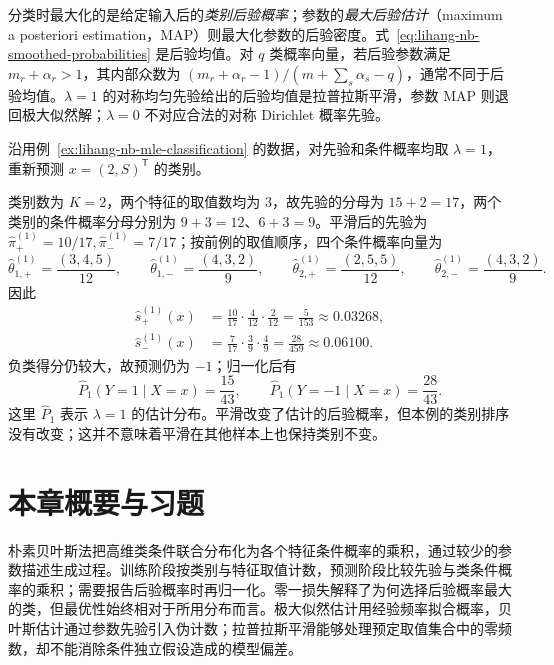 \begin{notealert}[type=caution,title={两种“后验最大化”的对象}]
分类时最大化的是给定输入后的\emph{类别后验概率}；参数的\emph{最大后验估计}（maximum a posteriori estimation，MAP）则最大化参数的后验密度。式~\eqref{eq:lihang-nb-smoothed-probabilities} 是后验均值。对 $q$ 类概率向量，若后验参数满足 $m_r+\alpha_r>1$，其内部众数为 $(m_r+\alpha_r-1)/(m+\sum_s\alpha_s-q)$，通常不同于后验均值。$\lambda=1$ 的对称均匀先验给出的后验均值是拉普拉斯平滑，参数 MAP 则退回极大似然解；$\lambda=0$ 不对应合法的对称 Dirichlet 概率先验。
\end{notealert}

\begin{example}
\label{ex:lihang-nb-laplace-classification}
沿用例~\ref{ex:lihang-nb-mle-classification} 的数据，对先验和条件概率均取 $\lambda=1$，重新预测 $x=(2,S)^{\mathsf T}$ 的类别。
\end{example}

\begin{solve}
类别数为 $K=2$，两个特征的取值数均为 $3$，故先验的分母为 $15+2=17$，两个类别的条件概率分母分别为 $9+3=12$、$6+3=9$。平滑后的先验为 $\widehat\pi_+^{(1)}=10/17,\widehat\pi_-^{(1)}=7/17$；按前例的取值顺序，四个条件概率向量为
\[
    \widehat\theta_{1,+}^{(1)}=\frac{(3,4,5)}{12},\qquad
    \widehat\theta_{1,-}^{(1)}=\frac{(4,3,2)}{9},\qquad
    \widehat\theta_{2,+}^{(1)}=\frac{(2,5,5)}{12},\qquad
    \widehat\theta_{2,-}^{(1)}=\frac{(4,3,2)}{9}.
\]
因此
\begin{align*}
    \widehat s_+^{(1)}(x)&=\frac{10}{17}\cdot\frac{4}{12}\cdot\frac{2}{12}
    =\frac{5}{153}\approx0.03268,\\
    \widehat s_-^{(1)}(x)&=\frac{7}{17}\cdot\frac{3}{9}\cdot\frac{4}{9}
    =\frac{28}{459}\approx0.06100.
\end{align*}
负类得分仍较大，故预测仍为 $-1$；归一化后有
\[
    \widehat P_1(Y=1\mid X=x)=\frac{15}{43},\qquad
    \widehat P_1(Y=-1\mid X=x)=\frac{28}{43}.
\]
这里 $\widehat P_1$ 表示 $\lambda=1$ 的估计分布。平滑改变了估计的后验概率，但本例的类别排序没有改变；这并不意味着平滑在其他样本上也保持类别不变。
\end{solve}

\section{本章概要与习题}
\label{sec:lihang-nb-summary-exercises}

朴素贝叶斯法把高维类条件联合分布化为各个特征条件概率的乘积，通过较少的参数描述生成过程。训练阶段按类别与特征取值计数，预测阶段比较先验与类条件概率的乘积；需要报告后验概率时再归一化。零一损失解释了为何选择后验概率最大的类，但最优性始终相对于所用分布而言。极大似然估计用经验频率拟合概率，贝叶斯估计通过参数先验引入伪计数；拉普拉斯平滑能够处理预定取值集合中的零频数，却不能消除条件独立假设造成的模型偏差。

